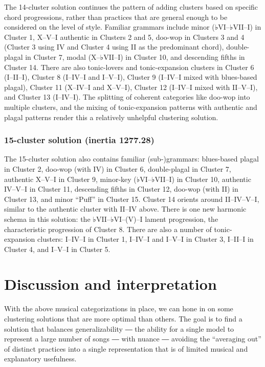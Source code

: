 The 14-cluster solution continues the pattern of adding clusters based on specific chord progressions, rather than practices that are general enough to be considered on the level of style. Familiar grammars include minor (♭VI–♭VII–I) in Cluster 1, X–V–I authentic in Clusters 2 and 5, doo-wop in Clusters 3 and 4 (Cluster 3 using IV and Cluster 4 using II as the predominant chord), double-plagal in Cluster 7, modal (X–♭VII–I) in Cluster 10, and descending fifths in Cluster 14. There are also tonic-lovers and tonic-expansion clusters in Cluster 6 (I–II–I), Cluster 8 (I–IV–I and I–V–I), Cluster 9 (I–IV–I mixed with blues-based plagal), Cluster 11 (X–IV–I and X–V–I), Cluster 12 (I–IV–I mixed with II–V–I), and Cluster 13 (I–IV–I). The splitting of coherent categories like doo-wop into multiple clusters, and the mixing of tonic-expansion patterns with authentic and plagal patterns render this a relatively unhelpful clustering solution.

\subsection{15-cluster solution (inertia 1277.28)}
\label{15-clustersolutioninertia1277.28}

The 15-cluster solution also contains familiar (sub-)grammars: blues-based plagal in Cluster 2, doo-wop (with IV) in Cluster 6, double-plagal in Cluster 7, authentic X–V–I in Cluster 9, minor-key (♭VI–♭VII–I) in Cluster 10, authentic IV–V–I in Cluster 11, descending fifths in Cluster 12, doo-wop (with II) in Cluster 13, and minor ``Puff'' in Cluster 15. Cluster 14 orients around II–IV–V–I, similar to the authentic cluster with II–IV above. There is one new harmonic schema in this solution: the ♭VII–♭VI–(V)–I lament progression, the characteristic progression of Cluster 8. There are also a number of tonic-expansion clusters: I–IV–I in Cluster 1, I–IV–I and I–V–I in Cluster 3, I–II–I in Cluster 4, and I–V–I in Cluster 5.

\chapter{Discussion and interpretation}
\label{discussionandinterpretation}

With the above musical categorizations in place, we can hone in on some clustering solutions that are more optimal than others. The goal is to find a solution that balances generalizability ― the ability for a single model to represent a large number of songs ― with nuance ― avoiding the ``averaging out'' of distinct practices into a single representation that is of limited musical and explanatory usefulness.

